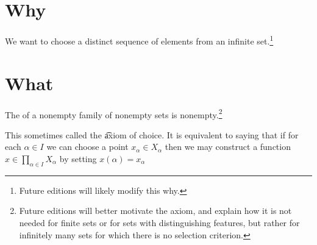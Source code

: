 

\section*{Why}

We want to choose a distinct sequence of elements from an infinite set.\footnote{Future editions will likely modify this why.}

\section*{What}

\begin{principle}[Choice]
The of a nonempty family of nonempty sets is nonempty.\footnote{Future editions will better motivate the axiom, and explain how it is not needed for finite sets or for sets with distinguishing features, but rather for infinitely many sets for which there is no selection criterion.}
\end{principle}

This sometimes called the \t{axiom of choice}.
It is equivalent to saying that if for each $\alpha  \in I$ we can choose a point $x_{\alpha } \in X_{\alpha }$ then we may construct a function $x \in \prod_{\alpha  \in I}X_{\alpha }$ by setting $x(\alpha ) = x_{\alpha }$

\blankpage
